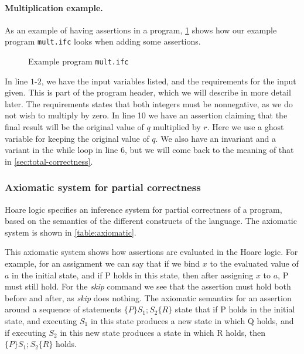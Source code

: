 \paragraph{Multiplication example.}
As an example of having assertions in a program, \cref{figure:mult} shows how our example program \texttt{mult.ifc} looks when adding some assertions.
\begin{figure}

\caption{Example program \texttt{mult.ifc}}
\label{figure:mult}
\end{figure}

In line $1$-$2$, we have the input variables listed, and the requirements for the input given.
This is part of the program header, which we will describe in more detail later.
The requirements states that both integers must be nonnegative, as we do not wish to multiply by zero.
In line 10 we have an assertion claiming that the final result will be the original value of $q$ multiplied by $r$. 
Here we use a ghost variable for keeping the original value of $q$.
We also have an invariant and a variant in the while loop in line 6, but we will come back to the meaning of that in \cref{sec:total-correctness}.


\subsubsection{Axiomatic system for partial correctness}
Hoare logic specifies an inference system for partial correctness of a program, based on the semantics of the different constructs of the language. The axiomatic system is shown in \cref{table:axiomatic}.

This axiomatic system shows how assertions are evaluated in the Hoare logic. 
For example, for an assignment we can say that if we bind $x$ to the evaluated value of $a$ in the initial state, and if P holds in this state, then after assigning $x$ to $a$, P must still hold.
For the \textit{skip} command we see that the assertion must hold both before and after, as \textit{skip} does nothing.
The axiomatic semantics for an assertion around a sequence of statements $\{P\} S_1;S_2\{R\}$ state that if P holds in the initial state, and executing $S_1$ in this state produces a new state in which Q holds, and if executing $S_2$ in this new state produces a state in which R holds, then $\{P\} S_1;S_2 \{R\}$ holds.

